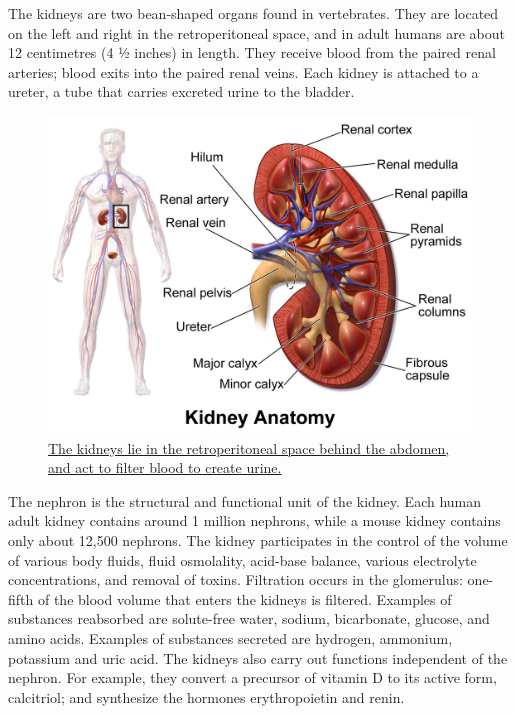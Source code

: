 The kidneys are two bean-shaped organs found in vertebrates. They are located on the left and right in the retroperitoneal space, and in adult humans are about 12 centimetres (4 1⁄2 inches) in length. They receive blood from the paired renal arteries; blood exits into the paired renal veins. Each kidney is attached to a ureter, a tube that carries excreted urine to the bladder.



\begin{figure}

{\centering \includegraphics[width=0.7\linewidth]{./figures/excretory/Blausen_0592_KidneyAnatomy_01} 

}

\caption{\href{https://commons.wikimedia.org/wiki/File:Blausen_0592_KidneyAnatomy_01.png}{The kidneys lie in the retroperitoneal space behind the abdomen, and act to filter blood to create urine.}}\label{fig:kidney}
\end{figure}

The nephron is the structural and functional unit of the kidney. Each human adult kidney contains around 1 million nephrons, while a mouse kidney contains only about 12,500 nephrons. The kidney participates in the control of the volume of various body fluids, fluid osmolality, acid-base balance, various electrolyte concentrations, and removal of toxins. Filtration occurs in the glomerulus: one-fifth of the blood volume that enters the kidneys is filtered. Examples of substances reabsorbed are solute-free water, sodium, bicarbonate, glucose, and amino acids. Examples of substances secreted are hydrogen, ammonium, potassium and uric acid. The kidneys also carry out functions independent of the nephron. For example, they convert a precursor of vitamin D to its active form, calcitriol; and synthesize the hormones erythropoietin and renin.

